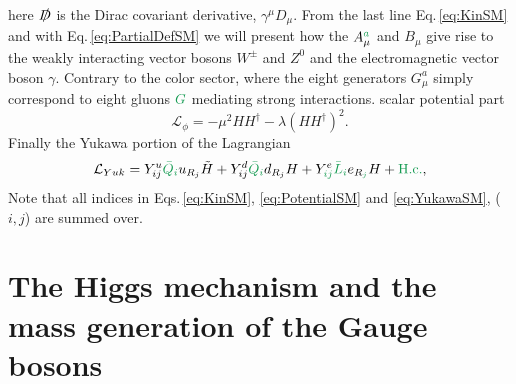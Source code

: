 here $\slashed{D}$ is the Dirac covariant derivative, $\gamma^\mu D_\mu$. From the last line  Eq.\,\eqref{eq:KinSM} and with Eq.\,\eqref{eq:PartialDefSM} we will present how the  $A^{\Joaoadd{a}}_\mu$ and $B_\mu$ give rise to the weakly interacting vector bosons $W^\pm$ and $Z^0$ and the electromagnetic vector boson $\gamma$. Contrary to the color sector, where the eight generators $G^a_\mu$ simply correspond to eight gluons $\Joaoadd{G}$  mediating  strong interactions.
%
 scalar potential part  
%
\begin{equation}
\label{eq:PotentialSM}
\mathcal{L}_{\phi} = -\mu^2 H H^\dagger - \lambda (H H^\dagger)^2.
\end{equation}
Finally the Yukawa portion of the Lagrangian  
\begin{equation}
\label{eq:YukawaSM}
\mathcal{L}_{Yuk} = Y^u_{ij} \Joaoadd{\bar{Q}}_{\Joaoadd{i}} u_{R_j}  \tilde{H} + Y^d_{ij} \Joaoadd{\bar{Q}}_{\Joaoadd{i}}  d_{R_j} H  + Y^e_{\Joaoadd{ij}} \Joaoadd{\bar{L}}_{\Joaoadd{i}}  e_{R_{\Joaoadd{j}}} H + \Joaoadd{\mathrm{H.c.}},
\end{equation}
%
  
%
%
 Note that  all indices  in Eqs.\,\eqref{eq:KinSM}, \eqref{eq:PotentialSM} and \eqref{eq:YukawaSM}, ($i,j$) are summed over. 


\renewcommand{\cleardoublepage}{}
\renewcommand{\clearpage}{}

\section{The Higgs mechanism and the mass generation of the Gauge bosons}\label{section:Higgs_mechanism}

